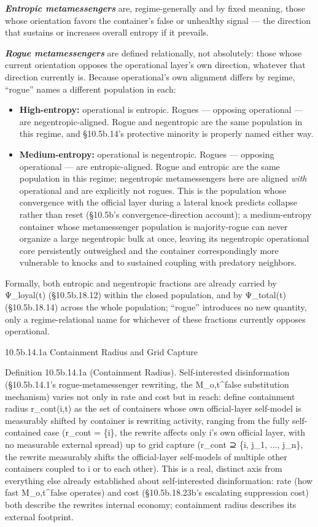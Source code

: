 \documentclass[
]{article}
\begin{document}
\emph{\textbf{Entropic metamessengers}} are, regime-generally and by
fixed meaning, those whose orientation favors the container's false or
unhealthy signal --- the direction that sustains or increases overall
entropy if it prevails.

\emph{\textbf{Rogue metamessengers}} are defined relationally, not
absolutely: those whose current orientation opposes the operational
layer's own direction, whatever that direction currently is. Because
operational's own alignment differs by regime, ``rogue'' names a
different population in each:

\begin{itemize}
\item
  \textbf{High-entropy:} operational is entropic. Rogues --- opposing
  operational --- are negentropic-aligned. Rogue and negentropic are the
  same population in this regime, and §10.5b.14's protective minority is
  properly named either way.
\item
  \textbf{Medium-entropy:} operational is negentropic. Rogues ---
  opposing operational --- are entropic-aligned. Rogue and entropic are
  the same population in this regime; negentropic metamessengers here
  are aligned \emph{with} operational and are explicitly not rogues.
  This is the population whose convergence with the official layer
  during a lateral knock predicts collapse rather than reset (§10.5b's
  convergence-direction account); a medium-entropy container whose
  metamessenger population is majority-rogue can never organize a large
  negentropic bulk at once, leaving its negentropic operational core
  persistently outweighed and the container correspondingly more
  vulnerable to knocks and to sustained coupling with predatory
  neighbors.
\end{itemize}

Formally, both entropic and negentropic fractions are already carried by
Ψ\_loyal(t) (§10.5b.18.12) within the closed population, and by
Ψ\_total(t) (§10.5b.18.14) across the whole population; ``rogue''
introduces no new quantity, only a regime-relational name for whichever
of these fractions currently opposes operational.

10.5b.14.1a Containment Radius and Grid Capture

Definition 10.5b.14.1a (Containment Radius). Self-interested
disinformation (§10.5b.14.1's rogue-metamessenger rewriting, the
M\_o,t\^{}false substitution mechanism) varies not only in rate and cost
but in reach: define containment radius r\_cont(i,t) as the set of
containers whose own official-layer self-model is measurably shifted by
container is rewriting activity, ranging from the fully self-contained
case (r\_cont = \{i\}, the rewrite affects only i's own official layer,
with no measurable external spread) up to grid capture (r\_cont ⊇ \{i,
j\_1, ..., j\_n\}, the rewrite measurably shifts the official-layer
self-models of multiple other containers coupled to i or to each other).
This is a real, distinct axis from everything else already established
about self-interested disinformation: rate (how fast M\_o,t\^{}false
operates) and cost (§10.5b.18.23b's escalating suppression cost) both
describe the rewrites internal economy; containment radius describes its
external footprint.
\end{document}
